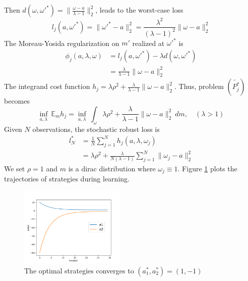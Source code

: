 \documentclass{article}
\begin{document}
\noindent Then $d(\omega,\omega'^*) = \| \frac{\omega - a}{\lambda-1} \|_2^2 $, leads to the worst-case loss
\begin{equation}
l_j(a,\omega'^*) = \| \omega'^*-a \|_2^2 = \frac{\lambda^2}{(\lambda-1)^2} \| \omega-a \|_2^2
\end{equation}
The Moreau-Yosida regularization on $m'$ realized at $\omega'^*$ is
\begin{equation}
\begin{aligned}
\phi_j(a,\lambda,\omega) &= l_j(a,\omega'^*)-\lambda d(\omega,\omega'^*) \\
&= \frac{\lambda}{\lambda - 1}\| \omega - a \|_2^2
\end{aligned}
\end{equation}
The integrand cost function $h_j = \lambda \rho^2 + \frac{\lambda}{\lambda - 1} \| \omega - a \|_2^2$.
Thus, problem $(\tilde{P_j^*})$ becomes
\begin{equation}
\inf_{a,\lambda} \ \mathbb{E}_m h_j = \inf_{a,\lambda} \ \int_\omega \lambda \rho^2 + \frac{\lambda}{\lambda - 1} \| \omega - a \|_2^2 \ dm, \quad (\lambda > 1)
\end{equation}
Given $N$ observations, the stochastic robust loss is
\begin{equation*}
\begin{aligned}
l^*_N &= \frac{1}{N}\sum_{j=1}^N h_j(a,\lambda,\omega_j) \\
&= \lambda \rho^2 + \frac{\lambda}{N(\lambda - 1)} \sum_{j=1}^N \|\omega_{j}-a\|_2^2
\end{aligned}
\end{equation*}
We set $\rho = 1$ and $m$ is a dirac distribution where $\omega_j \equiv 1$.
Figure \ref{fig:ep1} plots the trajectories of strategies during learning.

\begin{figure}[htb]
\centering
\includegraphics[width=0.45\textwidth]{FIGDRG/a1a2}
\caption{The optimal strategies converges to $(a_1^*,a_2^*)=(1,-1)$}
\label{fig:ep1}
\end{figure}
\end{document}
